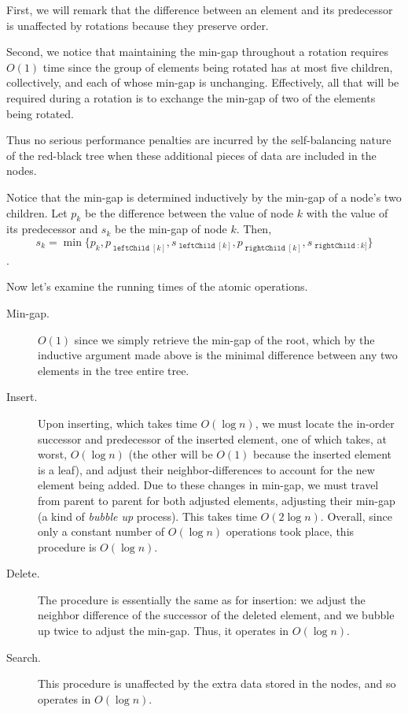 \documentclass{article}
\DeclareMathOperator{\leftChild}{\mathtt{leftChild}}
\DeclareMathOperator{\rightChild}{\mathtt{rightChild}}
\begin{document}
First, we will remark that the difference between an element and its
predecessor is unaffected by rotations because they preserve order.

Second, we notice that maintaining the min-gap throughout a rotation requires
$O(1)$ time since the group of elements being rotated has at most five
children, collectively, and each of whose min-gap is unchanging. Effectively,
all that will be required during a rotation is to exchange the min-gap of two
of the elements being rotated.

Thus no serious performance penalties are incurred by the self-balancing nature
of the red-black tree when these additional pieces of data are included in the
nodes.

Notice that the min-gap is determined inductively
by the min-gap of a node's two children. Let $p_k$ be
the difference between the value of node $k$ with the value of its predecessor
and $s_k$ be the min-gap of node $k$. Then,
$$s_k = \min\{p_k, p_{\leftChild{[k]}}, s_{\leftChild{[k]}}, p_{\rightChild{[k]}},
s_{\rightChild{:k]}}\}$$.

Now let's examine the running times of the atomic operations.

\begin{description}
    \item[Min-gap.] $O(1)$ since we simply retrieve the min-gap of the root,
        which by the inductive argument made above is the minimal difference
        between any two elements in the tree entire tree.
    \item[Insert.] Upon inserting, which takes time $O(\log n)$, we must locate
        the in-order successor and predecessor of the inserted element, one of
        which takes, at worst, $O(\log n)$ (the other will be $O(1)$ because
        the inserted element is a leaf), and adjust their neighbor-differences
        to account for the new element being added. Due to these changes in
        min-gap, we must travel from parent to parent for both adjusted
        elements, adjusting their min-gap (a kind of \emph{bubble up} process).
        This takes time $O(2 \log n)$. Overall, since only a constant number of
        $O(\log n)$ operations took place, this procedure is $O(\log n)$.
    \item[Delete.] The procedure is essentially the same as for insertion: we
        adjust the neighbor difference of the successor of the deleted element,
        and we bubble up twice to adjust the min-gap. Thus, it operates in
        $O(\log n)$.
    \item[Search.] This procedure is unaffected by the extra data stored in the
        nodes, and so operates in $O(\log n)$.
\end{description}
\end{document}

